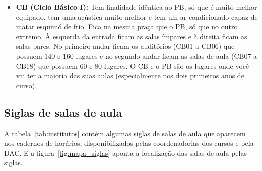 \begin{itemize}
    \item  \textbf{CB (Ciclo Básico I):} Tem finalidade idêntica ao PB, só que
    é muito melhor equipado, tem uma acústica muito melhor e tem um ar
    condicionado capaz de matar esquimó de frio. Fica na mesma praça que o PB,
    só que no outro extremo. À esquerda da entrada ficam as salas ímpares
    e à direita ficam as salas pares. No primeiro andar ficam os auditórios
    (CB01 a CB06) que possuem 140 e 160 lugares e no segundo andar ficam as
    salas de aula (CB07 a CB18) que possuem 60 e 80 lugares.  O CB e o PB são os
    lugares onde você vai ter a maioria das suas aulas (especialmente nos dois
    primeiros anos de curso).

\end{itemize}

\subsection{Siglas de salas de aula}

A tabela~\ref{tab:institutos} contém algumas siglas de salas de aula que aparecem nos cadernos
de horários, disponibilizados pelas coordenadorias dos cursos e pela DAC. E a figura~\ref{fig:mapa_siglas} aponta a localização das salas de aula pelas siglas.

